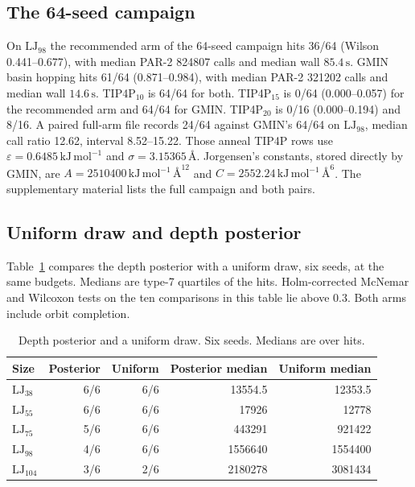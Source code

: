 \documentclass[aip,jcp,preprint,amsmath,amssymb,floatfix]{revtex4-2}
\begin{document}
\subsection{The 64-seed campaign}
On \(\mathrm{LJ}_{98}\) the recommended arm of the 64-seed campaign hits 36/64 (Wilson 0.441--0.677), with median PAR-2 824807 calls and median wall \(85.4\,\mathrm{s}\).
GMIN basin hopping hits 61/64 (0.871--0.984), with median PAR-2 321202 calls and median wall \(14.6\,\mathrm{s}\).
TIP4P\(_{10}\) is 64/64 for both.
TIP4P\(_{15}\) is 0/64 (0.000--0.057) for the recommended arm and 64/64 for GMIN.
TIP4P\(_{20}\) is 0/16 (0.000--0.194) and 8/16.
A paired full-arm file records 24/64 against GMIN's 64/64 on \(\mathrm{LJ}_{98}\), median call ratio 12.62, interval 8.52--15.22.
Those anneal TIP4P rows use \(\varepsilon=0.6485\,\mathrm{kJ\,mol^{-1}}\) and \(\sigma=3.15365\,\text{\AA}\).
Jorgensen's constants, stored directly by GMIN, are \(A=2510400\,\mathrm{kJ\,mol^{-1}\,\text{\AA}^{12}}\) and \(C=2552.24\,\mathrm{kJ\,mol^{-1}\,\text{\AA}^{6}}\).\cite{jorgensen1983}
The supplementary material lists the full campaign and both pairs.

\subsection{Uniform draw and depth posterior}
Table~\ref{tab:ablation} compares the depth posterior with a uniform draw, six seeds, at the same budgets.
Medians are type-7 quartiles of the hits.
Holm-corrected McNemar and Wilcoxon tests on the ten comparisons in this table lie above 0.3.
Both arms include orbit completion.

\begin{table}
\caption{Depth posterior and a uniform draw.
Six seeds.
Medians are over hits.}
\label{tab:ablation}
\begin{ruledtabular}
\begin{tabular}{lrrrr}
Size & Posterior & Uniform & Posterior median & Uniform median \\
\hline
\(\mathrm{LJ}_{38}\) & 6/6 & 6/6 & 13554.5 & 12353.5 \\
\(\mathrm{LJ}_{55}\) & 6/6 & 6/6 & 17926 & 12778 \\
\(\mathrm{LJ}_{75}\) & 5/6 & 6/6 & 443291 & 921422 \\
\(\mathrm{LJ}_{98}\) & 4/6 & 6/6 & 1556640 & 1554400 \\
\(\mathrm{LJ}_{104}\) & 3/6 & 2/6 & 2180278 & 3081434 \\
\end{tabular}
\end{ruledtabular}
\end{table}
\end{document}
